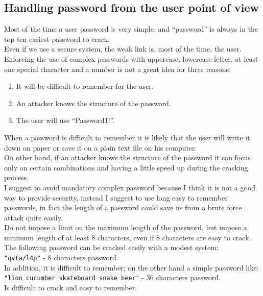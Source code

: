 \subsection{Handling password from the user point of view}
Most of the time a user password is very simple, and ``password'' is always in the top ten easiest password to crack.\\
Even if we use a secure system, the weak link is, most of the time, the user.\\
Enforcing the use of complex passwords with uppercase, lowercase letter, at least one special character and a number is not a great idea for three reasons:
\begin{enumerate}
	\item It will be difficult to remember for the user.
	\item An attacker knows the structure of the password.
	\item The user will use ``Password1!''.
\end{enumerate}

When a password is difficult to remember it is likely that the user will write it down on paper or save it on a plain text file on his computer.\\
On other hand, if an attacker knows the structure of the password it can focus only on certain combinations and having a little speed up during the cracking process.\\

I suggest to avoid mandatory complex password because I think it is not a good way to provide security, instead I suggest to use long easy to remember passwords, in fact the length of a password could save us from a brute force attack quite easily.\\
Do not impose a limit on the maximum length of the password, but impose a minimum length of at least 8 characters, even if 8 characters are easy to crack.\\
The following password can be cracked easily with a modest system:\\
\texttt{"qv£a/l4p"} - 8 characters password.\\
In addition, it is difficult to remember; on the other hand a simple password like:\\
\texttt{"lion cucumber skateboard snake beer"} - 36 characters password.\\
Is difficult to crack and easy to remember.

